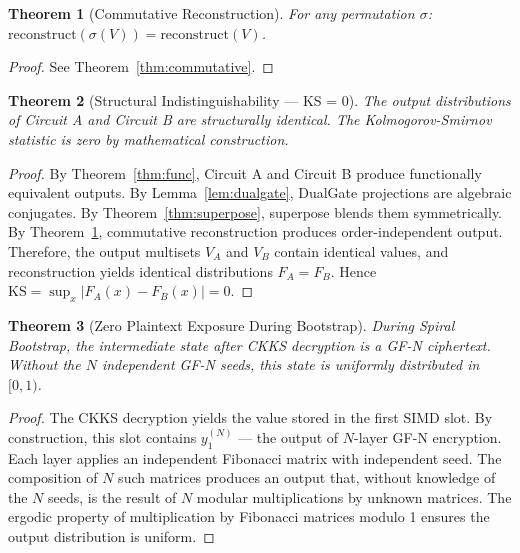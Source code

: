 \documentclass[11pt,a4paper]{article}
\newtheorem{theorem}{Theorem}[section]
\begin{document}
\begin{theorem}[Commutative Reconstruction]\label{thm:commutative2}
For any permutation $\sigma$: $\text{reconstruct}(\sigma(V)) = \text{reconstruct}(V)$.
\end{theorem}
\begin{proof} See Theorem~\ref{thm:commutative}. \end{proof}

\begin{theorem}[Structural Indistinguishability — KS = 0]\label{thm:kszero}
The output distributions of Circuit A and Circuit B are structurally identical. The Kolmogorov-Smirnov statistic is zero by mathematical construction.
\end{theorem}
\begin{proof}
By Theorem~\ref{thm:func}, Circuit A and Circuit B produce functionally equivalent outputs. By Lemma~\ref{lem:dualgate}, DualGate projections are algebraic conjugates. By Theorem~\ref{thm:superpose}, superpose blends them symmetrically. By Theorem~\ref{thm:commutative2}, commutative reconstruction produces order-independent output. Therefore, the output multisets $V_A$ and $V_B$ contain identical values, and reconstruction yields identical distributions $F_A = F_B$. Hence $\text{KS} = \sup_x |F_A(x) - F_B(x)| = 0$.
\end{proof}

\begin{theorem}[Zero Plaintext Exposure During Bootstrap]\label{thm:noplaintext}
During Spiral Bootstrap, the intermediate state after CKKS decryption is a GF-N ciphertext. Without the $N$ independent GF-N seeds, this state is uniformly distributed in $[0,1)$.
\end{theorem}
\begin{proof}
The CKKS decryption yields the value stored in the first SIMD slot. By construction, this slot contains $y_1^{(N)}$ — the output of $N$-layer GF-N encryption. Each layer applies an independent Fibonacci matrix with independent seed. The composition of $N$ such matrices produces an output that, without knowledge of the $N$ seeds, is the result of $N$ modular multiplications by unknown matrices. The ergodic property of multiplication by Fibonacci matrices modulo 1 ensures the output distribution is uniform.
\end{proof}
\end{document}
